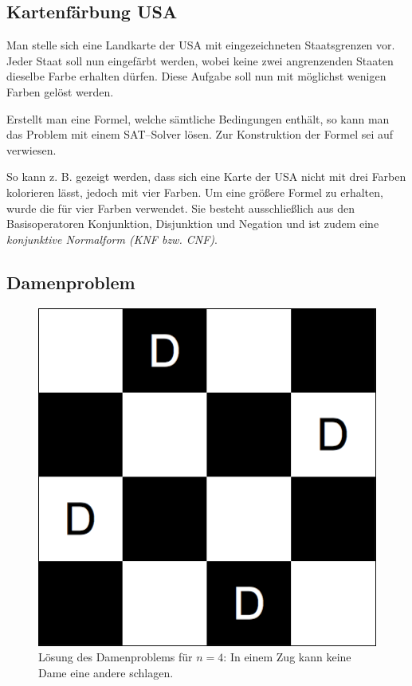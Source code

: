 \documentclass[ngerman,a4paper,abstracton,open=right,twoside=false,toc=listofnumbered,bibtotocnumbered]{scrreprt}
\begin{document}
\subsection{Kartenfärbung USA}

Man stelle sich eine Landkarte der USA mit eingezeichneten Staatsgrenzen vor. Jeder Staat soll nun eingefärbt werden, wobei keine zwei angrenzenden Staaten dieselbe Farbe erhalten dürfen. Diese Aufgabe soll nun mit möglichst wenigen Farben gelöst werden.

Erstellt man eine Formel, welche sämtliche Bedingungen enthält, so kann man das Problem mit einem SAT--Solver lösen. Zur Konstruktion der Formel sei auf \cite{mpa-logeleien} verwiesen.

So kann z. B. gezeigt werden, dass sich eine Karte der USA nicht mit drei Farben kolorieren lässt, jedoch mit vier Farben. Um eine größere Formel zu erhalten, wurde die für vier Farben verwendet. Sie besteht ausschließlich aus den Basisoperatoren Konjunktion, Disjunktion und Negation und ist zudem eine \emph{konjunktive Normalform (KNF bzw. CNF)}.

\subsection{Damenproblem}

\begin{figure}[ht]
	\begin{center}
		\includegraphics[scale=0.5]{img/four-queens}
	\end{center}
	\caption{\label{four-queens} Lösung des Damenproblems für $n = 4$: In einem Zug kann keine Dame eine andere schlagen.}
\end{figure}
\end{document}
